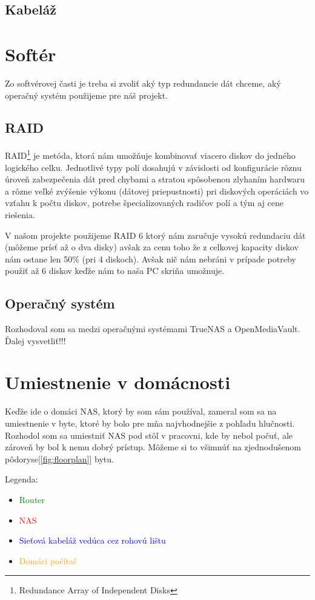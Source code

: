 \documentclass[12pt,oneside,slovak,a4paper]{article}
\begin{document}
\subsection{Kabeláž}

\section{Softér}
Zo softvérovej časti je treba si zvoliť aký typ redundancie dát chceme, aký operačný systém použijeme pre náš projekt.

\subsection{RAID}
RAID\footnote{Redundance Array of Independent Disks} je metóda, ktorá nám umožňuje kombinovať viacero diskov do jedného logického celku. Jednotlivé typy polí dosahujú v závislosti od konfigurácie rôznu úroveň zabezpečenia dát pred chybami a stratou spôsobenou zlyhaním hardwaru a rôzne veľké zvýšenie výkonu (dátovej priepustnosti) pri diskových operáciách vo vzťahu k počtu diskov, potrebe špecializovaných radičov polí a tým aj cene riešenia.

V našom projekte použijeme RAID 6 ktorý nám zaručuje vysokú redundaciu dát (môžeme prísť až o dva disky) avšak za cenu toho že z celkovej kapacity diskov nám ostane len 50\% (pri 4 diskoch). Avšak nič nám nebráni v prípade potreby použiť až 6 diskov keďže nám to naša PC skriňa umožnuje.

\subsection{Operačný systém}
Rozhodoval som sa medzi operačnými systémami TrueNAS a OpenMediaVault. Ďalej vysvetliť!!!

\section{Umiestnenie v domácnosti}
Keďže ide o domáci NAS, ktorý by som sám používal, zameral som sa na umiestnenie v byte, ktoré by bolo pre mňa najvhodnejšie z pohľadu hlučnosti. Rozhodol som sa umiestniť NAS pod stôl v pracovni, kde by nebol počuť, ale zároveň by bol k nemu dobrý prístup. Môžeme si to všimnúť na zjednodušenom pôdoryse[\ref{fig:floorplan}] bytu.

Legenda:
\begin{spacing}{1.0}
\begin{itemize}
	\item \textcolor{green}{Router}
	\item \textcolor{red}{NAS}
	\item \textcolor{blue}{Sieťová kabeláž vedúca cez rohovú lištu}
	\item \textcolor{orange}{Domáci počítač}
\end{itemize}
\end{spacing}
\end{document}
